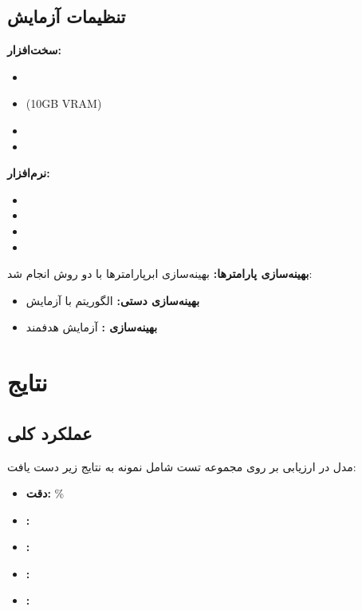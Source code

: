 \documentclass[a4paper,11pt]{article}
\begin{document}
\subsection{تنظیمات آزمایش}
\textbf{سخت‌افزار:}
\begin{itemize}
  \item {}
  \item {} (10GB VRAM)
  \item {}
  \item {}
\end{itemize}

\textbf{نرم‌افزار:}
\begin{itemize}
  \item {}
  \item {}
  \item {}
  \item {}
\end{itemize}

\textbf{بهینه‌سازی پارامترها:}
بهینه‌سازی ابرپارامترها با دو روش انجام شد:
\begin{itemize}
  \item \textbf{بهینه‌سازی دستی:} الگوریتم  با  آزمایش
  \item \textbf{بهینه‌سازی :}  آزمایش هدفمند
\end{itemize}

\section{نتایج}
\subsection{عملکرد کلی}
مدل  در ارزیابی بر روی مجموعه تست شامل  نمونه به نتایج زیر دست یافت:
\begin{itemize}
    \item \textbf{دقت:} \%
    \item \textbf{:} 
    \item \textbf{:} 
    \item \textbf{:} 
    \item \textbf{:} 
\end{itemize}
\end{document}
